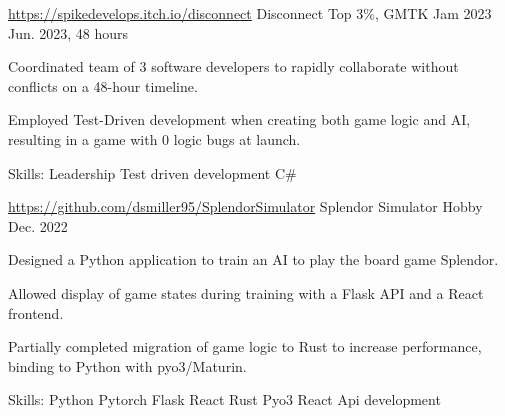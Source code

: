 \begin{cventries}
  \cventry
 {\href{https://spikedevelops.itch.io/disconnect}{https://spikedevelops.itch.io/disconnect}} %
 {Disconnect} %
 {Top 3\%, GMTK Jam 2023} %
 {Jun. 2023, 48 hours} %
 {
      \begin{cvitems} %
        \item {Coordinated team of 3 software developers to rapidly collaborate without conflicts on a 48-hour timeline.}
        \item {Employed Test-Driven development when creating both game logic and AI, resulting in a game with 0 logic bugs at launch.}
        \item {Skills: Leadership \textbullet{} Test driven development \textbullet{} C\#}
      \end{cvitems}
 }

 \cventry
 {\href{https://github.com/dsmiller95/SplendorSimulator}{https://github.com/dsmiller95/SplendorSimulator}} %
 {Splendor Simulator} %
 {Hobby} %
 {Dec. 2022} %
 {
     \begin{cvitems} %
      \item {Designed a Python application to train an AI to play the board game Splendor.}
      \item {Allowed display of game states during training with a Flask API and a React frontend.}
      \item {Partially completed migration of game logic to Rust to increase performance, binding to Python with pyo3/Maturin.}
      \item {Skills: Python \textbullet{} Pytorch \textbullet{} Flask \textbullet{} React \textbullet{} Rust \textbullet{} Pyo3 \textbullet{} React \textbullet{} Api development }
     \end{cvitems}
 }



\end{cventries}
